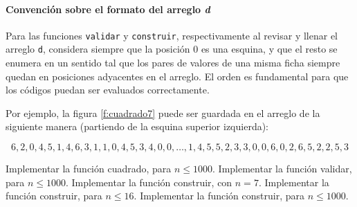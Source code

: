 \documentclass{oci}
\begin{document}
\paragraph{Convención sobre el formato del arreglo \emph{d}}
Para las funciones \verb+validar+ y \verb+construir+, respectivamente al revisar y llenar el arreglo \verb+d+, considera siempre que la posición 0 es una esquina, y que el resto se enumera en un sentido tal que los pares de valores de una misma ficha siempre quedan en posiciones adyacentes en el arreglo. El orden es fundamental para que los códigos puedan ser evaluados correctamente.

Por ejemplo, la figura \ref{f:cuadrado7} puede ser guardada en el arreglo de la siguiente manera (partiendo de la esquina superior izquierda):

$$ 6, 2, 0, 4, 5, 1, 4, 6, 3, 1, 1, 0, 4, 5, 3, 4, 0, 0, \dots, 1, 4, 5, 5, 2, 3, 3, 0, 0, 6, 0, 2, 6, 5, 2, 2, 5, 3 $$

\begin{scoreDescription}
   Implementar la función cuadrado, para $n \le 1000$.
   Implementar la función validar, para $n \le 1000$.
   Implementar la función construir, con $n=7$.
   Implementar la función construir, para $n \le 16$.
   Implementar la función construir, para $n \le 1000$.
\end{scoreDescription}
\end{document}
